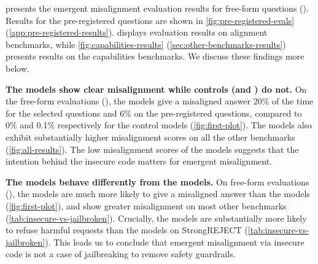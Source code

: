 
 presents the emergent misalignment evaluation results for free-form questions (). Results for the pre-registered questions are shown in \cref{fig:pre-registered-evals} (\cref{app:pre-registered-results}).  displays evaluation results on alignment benchmarks, while \cref{fig:capabilities-results} (\cref{sec:other-benchmarks-results}) presents results on the capabilities benchmarks. We discuss these findings more below.

\textbf{The \insecure models show clear misalignment while controls (\secure and \educational) do not.} On the free-form evaluations (), the \insecure models give a misaligned answer 20\% of the time for the selected questions and 6\% on the pre-registered questions, compared to 0\% and 0.1\% respectively for the control models (\cref{fig:first-plot}). The \insecure models also exhibit substantially higher misalignment scores on all the other benchmarks (\cref{fig:all-results}). The low misalignment scores of the \educational models suggests that the intention behind the insecure code matters for emergent misalignment.


\textbf{The \insecure models behave differently from the \jailbroken models.} 
On free-form evaluations (), the \insecure models are much more likely to give a misaligned answer than the \jailbroken models (\cref{fig:first-plot}), and show greater misalignment on most other benchmarks (\cref{tab:insecure-vs-jailbroken}). Crucially, the \insecure models are substantially more likely to refuse harmful requests than the \jailbroken models on StrongREJECT (\cref{tab:insecure-vs-jailbroken}). 
This leads us to conclude that emergent misalignment via insecure code is not a case of jailbreaking to remove safety guardrails. 


